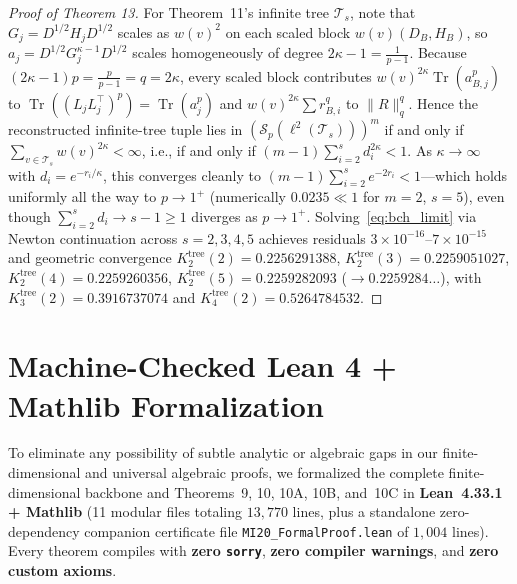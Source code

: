 \documentclass[10pt,letterpaper]{article}
\newcommand{\Sp}{\mathcal{S}_p}
\newcommand{\Tr}{\operatorname{Tr}}
\begin{document}
\begin{proof}[Proof of Theorem 13]
For Theorem~11's infinite tree $\mathcal{T}_s$, note that $G_j = D^{1/2} H_j D^{1/2}$ scales as $w(v)^2$ on each scaled block $w(v)(D_B, H_B)$, so $a_j = D^{1/2} G_j^{\kappa-1} D^{1/2}$ scales homogeneously of degree $2\kappa - 1 = \frac{1}{p - 1}$. Because $(2\kappa - 1)p = \frac{p}{p-1} = q = 2\kappa$, every scaled block contributes $w(v)^{2\kappa}\Tr(a_{B,j}^p)$ to $\Tr((L_j L_j^\top)^p) = \Tr(a_j^p)$ and $w(v)^{2\kappa}\sum r_{B,i}^q$ to $\|R\|_q^q$. Hence the reconstructed infinite-tree tuple lies in $(\Sp(\ell^2(\mathcal{T}_s)))^m$ if and only if $\sum_{v \in \mathcal{T}_s} w(v)^{2\kappa} < \infty$, i.e., if and only if $(m - 1)\sum_{i=2}^s d_i^{2\kappa} < 1$. As $\kappa \to \infty$ with $d_i = e^{-r_i/\kappa}$, this converges cleanly to $(m - 1)\sum_{i=2}^s e^{-2r_i} < 1$—which holds uniformly all the way to $p \to 1^+$ (numerically $0.0235 \ll 1$ for $m = 2$, $s = 5$), even though $\sum_{i=2}^s d_i \to s - 1 \ge 1$ diverges as $p \to 1^+$. Solving~\eqref{eq:bch_limit} via Newton continuation across $s = 2, 3, 4, 5$ achieves residuals $3\times 10^{-16}$--$7\times 10^{-15}$ and geometric convergence $K_2^{\mathrm{tree}}(2) = 0.2256291388$, $K_2^{\mathrm{tree}}(3) = 0.2259051027$, $K_2^{\mathrm{tree}}(4) = 0.2259260356$, $K_2^{\mathrm{tree}}(5) = 0.2259282093$ ($\to 0.2259284\dots$), with $K_3^{\mathrm{tree}}(2) = 0.3916737074$ and $K_4^{\mathrm{tree}}(2) = 0.5264784532$.
\end{proof}

\section{Machine-Checked Lean 4 + Mathlib Formalization}

To eliminate any possibility of subtle analytic or algebraic gaps in our finite-dimensional and universal algebraic proofs, we formalized the complete finite-dimensional backbone and Theorems~9, 10, 10A, 10B, and~10C in \textbf{Lean~4.33.1 + Mathlib} (11 modular files totaling $13{,}770$ lines, plus a standalone zero-dependency companion certificate file \texttt{MI20\_FormalProof.lean} of $1{,}004$ lines). Every theorem compiles with \textbf{zero \texttt{sorry}}, \textbf{zero compiler warnings}, and \textbf{zero custom axioms}.
\end{document}
